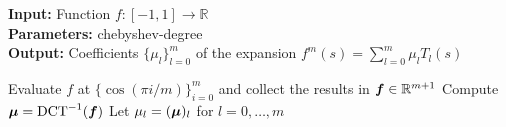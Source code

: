 \hspace*{\algorithmicindent} \textbf{Input:} Function $f:[-1, 1] \to \mathbb{R}$ \\%
\hspace*{\algorithmicindent} \textbf{Parameters:} \gls{chebyshev-degree} \\
\hspace*{\algorithmicindent} \textbf{Output:} Coefficients $\{ \mu_l \}_{l=0}^m$ of the expansion $f^m(s) = \sum_{l=0}^m \mu_l T_l(s)$
\begin{algorithmic}[1]
    \State Evaluate $f$ at $\{\cos(\pi i / m)\}_{i=0}^m$ and collect the results in $\boldsymbol{f}\in \mathbb{R}^{m+1}$
    \State Compute $\boldsymbol{\mu} = \operatorname{DCT}^{-1}(\boldsymbol{f})$
    \State Let $\mu_l = (\boldsymbol{\mu})_l$ for $l=0,\dots,m$
\end{algorithmic}
